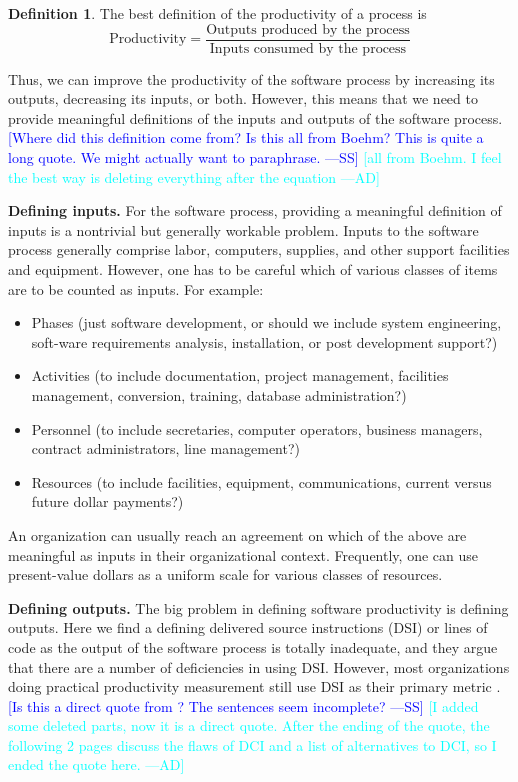 \documentclass[letterpaper, cleveref]{lipics-v2019}
\newcommand{\authornote}[3]{\textcolor{#1}{[#3 ---#2]}}
\newcommand{\authornote}[3]{}
\newcommand{\wss}[1]{\authornote{blue}{SS}{#1}} %
\newcommand{\ad}[1]{\authornote{cyan}{AD}{#1}} %
\theoremstyle{definition}
\newtheorem{defn}{Definition}
\begin{document}
\begin{defn}
  The best definition of the productivity of a process is
	\[\text{Productivity} = \dfrac{\text{Outputs produced by the
              process}}{\text{Inputs consumed by the process}}\]

Thus, we can improve the productivity of the software process by increasing its
outputs, decreasing its inputs, or both. However, this means that we need to
provide meaningful definitions of the inputs and outputs of the software
process. \wss{Where did this definition come from?  Is this all from Boehm?
  This is quite a long quote.  We might actually want to paraphrase.}
\ad{all from Boehm. I feel the best way is deleting everything after the
equation}

\textbf{Defining inputs.} For the software process, providing a meaningful
definition of inputs is a nontrivial but generally workable problem. Inputs to
the software process generally comprise labor, computers, supplies, and other
support facilities and equipment. However, one has to be careful which of
various classes of items are to be counted as inputs. For example:
\begin{itemize}
\item Phases (just software development, or should we include system
engineering, soft-ware requirements analysis, installation, or post development
support?)
\item Activities (to include documentation, project management, facilities
management, conversion, training, database administration?)
\item Personnel (to include secretaries, computer operators, business managers,
contract administrators, line management?)
\item Resources (to include facilities, equipment, communications, current
versus future dollar payments?)
\end{itemize}
An organization can usually reach an agreement on which of the above are
meaningful as inputs in their organizational context. Frequently, one can use
present-value dollars as a uniform scale for various classes of resources.

\textbf{Defining outputs.} The big problem in defining software productivity is
defining outputs. Here we find a defining delivered source instructions (DSI) or
lines of code as the output of the software process is totally inadequate, and
they argue that there are a number of deficiencies in using DSI. However,
	most organizations doing practical productivity measurement still use DSI as
	their primary metric \citep{Boehm1987}. \wss{Is this a direct quote from
		\citet{Boehm1987}?  The sentences seem incomplete?}
\ad{I added some deleted parts, now it is a direct quote. After the ending of
the quote, the following 2 pages discuss the flaws of DCI and a list of
alternatives to DCI, so I ended the quote here.}
\end{defn}
\end{document}
